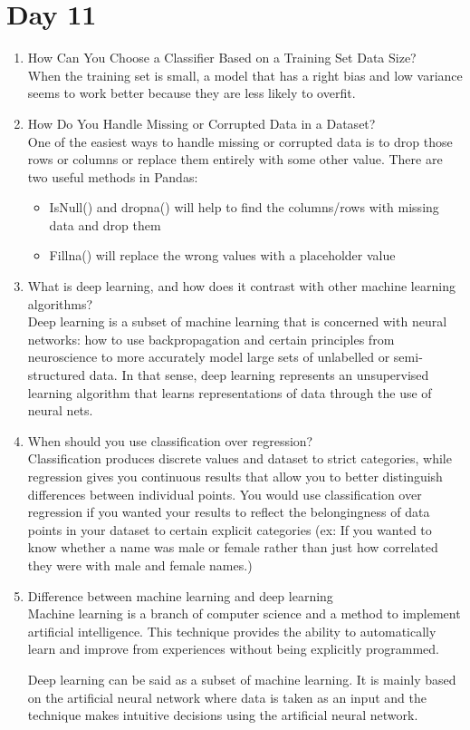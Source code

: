 \documentclass[11pt]{article}
\begin{document}
\section{Day 11}
\begin{enumerate}
\item How Can You Choose a Classifier Based on a Training Set Data Size?\\[.5em]
When the training set is small, a model that has a right bias and low variance seems to work
better because they are less likely to overfit.

\item How Do You Handle Missing or Corrupted Data in a Dataset?\\[.5em]
One of the easiest ways to handle missing or corrupted data is to drop those rows or columns or
replace them entirely with some other value.
There are two useful methods in Pandas:
\begin{itemize}
\item IsNull() and dropna() will help to find the columns/rows with missing data and drop them
\item Fillna() will replace the wrong values with a placeholder value
\end{itemize}

\item What is deep learning, and how does it contrast with other machine learning
algorithms?\\[.5em]
Deep learning is a subset of machine learning that is concerned with neural networks: how to
use backpropagation and certain principles from neuroscience to more accurately model large
sets of unlabelled or semi-structured data. In that sense, deep learning represents an unsupervised learning algorithm that learns representations of data through the use of neural
nets.

\item When should you use classification over regression?\\[.5em]
Classification produces discrete values and dataset to strict categories, while regression gives
you continuous results that allow you to better distinguish differences between individual points.
You would use classification over regression if you wanted your results to reflect the
belongingness of data points in your dataset to certain explicit categories (ex: If you wanted to
know whether a name was male or female rather than just how correlated they were with male
and female names.)

\item Difference between machine learning and deep learning\\[.5em]
Machine learning is a branch of computer science and a method to implement artificial
intelligence. This technique provides the ability to automatically learn and improve from
experiences without being explicitly programmed.

Deep learning can be said as a subset of machine learning. It is mainly based on the artificial
neural network where data is taken as an input and the technique makes intuitive decisions
using the artificial neural network.
\end{enumerate}
\end{document}
